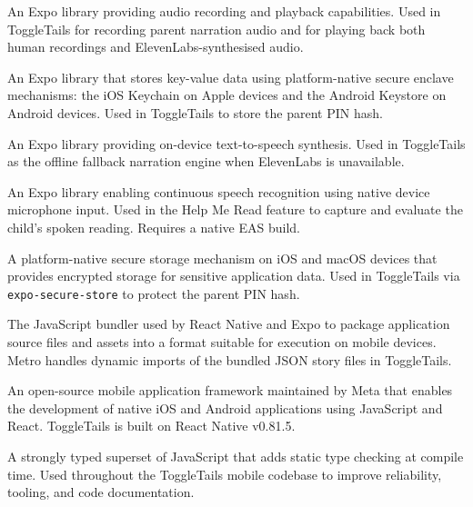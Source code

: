 \begin{description}[leftmargin=2.5cm, style=nextline]
\item[\textbf{expo-av}]
An Expo library providing audio recording and playback capabilities. Used in
ToggleTails for recording parent narration audio and for playing back both
human recordings and ElevenLabs-synthesised audio.

\item[\textbf{expo-secure-store}]
An Expo library that stores key-value data using platform-native secure
enclave mechanisms: the iOS Keychain on Apple devices and the Android
Keystore on Android devices. Used in ToggleTails to store the parent PIN hash.

\item[\textbf{expo-speech}]
An Expo library providing on-device text-to-speech synthesis. Used in
ToggleTails as the offline fallback narration engine when ElevenLabs is
unavailable.

\item[\textbf{expo-speech-recognition}]
An Expo library enabling continuous speech recognition using native device
microphone input. Used in the Help Me Read feature to capture and evaluate
the child's spoken reading. Requires a native EAS build.

\item[\textbf{iOS Keychain}]
A platform-native secure storage mechanism on iOS and macOS devices that
provides encrypted storage for sensitive application data. Used in ToggleTails
via \texttt{expo-secure-store} to protect the parent PIN hash.

\item[\textbf{Metro Bundler}]
The JavaScript bundler used by React Native and Expo to package application
source files and assets into a format suitable for execution on mobile
devices. Metro handles dynamic imports of the bundled JSON story files in
ToggleTails.

\item[\textbf{React Native}]
An open-source mobile application framework maintained by Meta that enables
the development of native iOS and Android applications using JavaScript and
React. ToggleTails is built on React Native v0.81.5.

\item[\textbf{TypeScript}]
A strongly typed superset of JavaScript that adds static type checking at
compile time. Used throughout the ToggleTails mobile codebase to improve
reliability, tooling, and code documentation.

\end{description}

